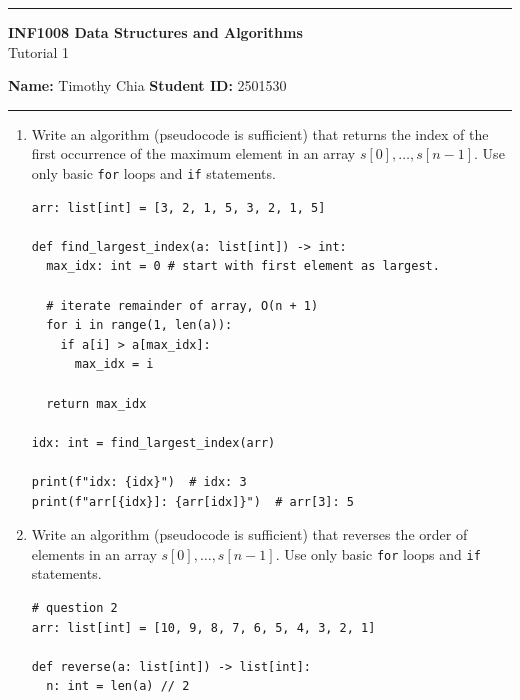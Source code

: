 \documentclass[12pt]{scrartcl}
\begin{document}
\begin{center}
	\hrule
	\vspace{0.4cm}
	{\textbf{\large INF1008 Data Structures and Algorithms}}\\[0.2cm]
	Tutorial 1
\end{center}

\textbf{Name:} Timothy Chia\hspace{\fill} \textbf{Student ID:} 2501530\\

\hrule

\vspace{0.3cm}

\begin{enumerate}[label=\textbf{\arabic*.}]

	\item
	      Write an algorithm (pseudocode is sufficient) that returns the index of the first occurrence of the maximum element in an array \( s[0], \ldots, s[n-1] \).
	      Use only basic \texttt{for} loops and \texttt{if} statements.

	      \vspace{0.3cm}
	      \begin{lstlisting}
arr: list[int] = [3, 2, 1, 5, 3, 2, 1, 5]

def find_largest_index(a: list[int]) -> int:
  max_idx: int = 0 # start with first element as largest.

  # iterate remainder of array, O(n + 1)
  for i in range(1, len(a)):
    if a[i] > a[max_idx]:
      max_idx = i

  return max_idx

idx: int = find_largest_index(arr)

print(f"idx: {idx}")  # idx: 3
print(f"arr[{idx}]: {arr[idx]}")  # arr[3]: 5
\end{lstlisting}

	      \vspace{0.3cm}
	\item
	      Write an algorithm (pseudocode is sufficient) that reverses the order of elements in an array \( s[0], \ldots, s[n-1] \).
	      Use only basic \texttt{for} loops and \texttt{if} statements.

	      \vspace{0.3cm}
	      \begin{lstlisting}
# question 2
arr: list[int] = [10, 9, 8, 7, 6, 5, 4, 3, 2, 1]

def reverse(a: list[int]) -> list[int]:
  n: int = len(a) // 2


\end{lstlisting}
\end{enumerate}
\end{document}
